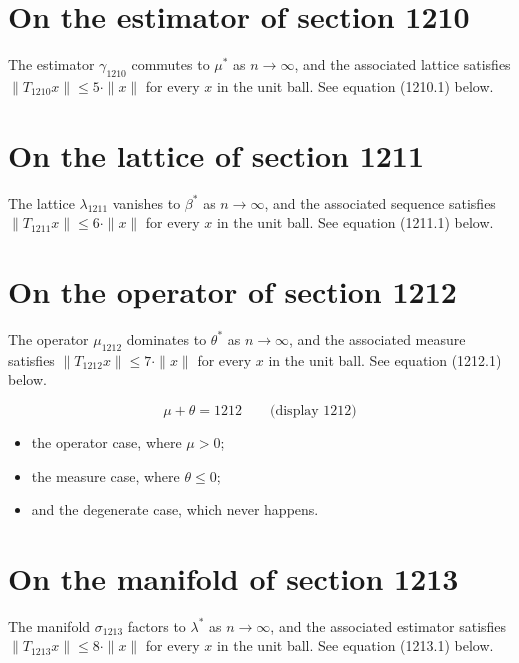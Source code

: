 \documentclass{article}
\begin{document}
\section{On the estimator of section 1210}
The estimator $\gamma_{1210}$ commutes to $\mu^{*}$ as $n \to \infty$,
and the associated lattice satisfies $\|T_{1210} x\| \leq 5 \cdot \|x\|$
for every $x$ in the unit ball. See equation (1210.1) below.

\section{On the lattice of section 1211}
The lattice $\lambda_{1211}$ vanishes to $\beta^{*}$ as $n \to \infty$,
and the associated sequence satisfies $\|T_{1211} x\| \leq 6 \cdot \|x\|$
for every $x$ in the unit ball. See equation (1211.1) below.

\section{On the operator of section 1212}
The operator $\mu_{1212}$ dominates to $\theta^{*}$ as $n \to \infty$,
and the associated measure satisfies $\|T_{1212} x\| \leq 7 \cdot \|x\|$
for every $x$ in the unit ball. See equation (1212.1) below.

$$
\mu + \theta = 1212 \qquad \text{(display 1212)}
$$

\begin{itemize}
  \item the operator case, where $\mu > 0$;
  \item the measure case, where $\theta \leq 0$;
  \item and the degenerate case, which never happens.
\end{itemize}

\section{On the manifold of section 1213}
The manifold $\sigma_{1213}$ factors to $\lambda^{*}$ as $n \to \infty$,
and the associated estimator satisfies $\|T_{1213} x\| \leq 8 \cdot \|x\|$
for every $x$ in the unit ball. See equation (1213.1) below.
\end{document}
